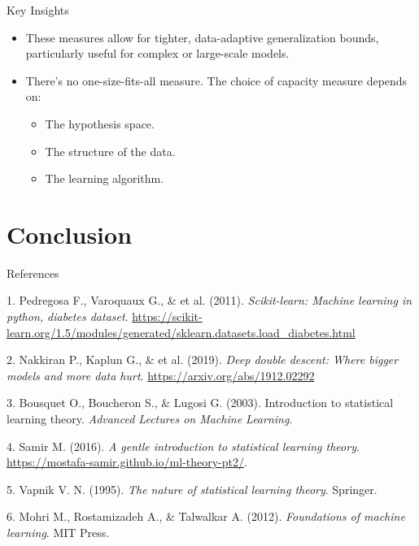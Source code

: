 \documentclass[
  ignorenonframetext,
]{beamer}
\providecommand{\tightlist}{%
  \setlength{\itemsep}{0pt}\setlength{\parskip}{0pt}}\usepackage{longtable,booktabs,array}
\newlength{\cslhangindent}
\newenvironment{CSLReferences}[2] %
 {\begin{list}{}{%
  \setlength{\itemindent}{0pt}
  \setlength{\leftmargin}{0pt}
  \setlength{\parsep}{0pt}
  \ifodd #1
   \setlength{\leftmargin}{\cslhangindent}
   \setlength{\itemindent}{-1\cslhangindent}
  \fi
  \setlength{\itemsep}{#2\baselineskip}}}
 {\end{list}}
\begin{document}
\begin{frame}
\begin{block}{Key Insights}
\label{key-insights-3}
\begin{itemize}
\tightlist
\item
  These measures allow for tighter, data-adaptive generalization bounds,
  particularly useful for complex or large-scale models.
\item
  There's no one-size-fits-all measure. The choice of capacity measure
  depends on:

  \begin{itemize}
  \tightlist
  \item
    The hypothesis space.
  \item
    The structure of the data.
  \item
    The learning algorithm.
  \end{itemize}
\end{itemize}
\end{block}
\end{frame}

\section{Conclusion}\label{conclusion}

\begin{frame}
\begin{block}{References}
\label{references}
\label{refs}
\begin{CSLReferences}{1}{0}
1. Pedregosa F., Varoquaux G., \& et al. (2011). \emph{Scikit-learn:
Machine learning in python, diabetes dataset}.
\url{https://scikit-learn.org/1.5/modules/generated/sklearn.datasets.load_diabetes.html}

2. Nakkiran P., Kaplun G., \& et al. (2019). \emph{Deep double descent:
Where bigger models and more data hurt}.
\url{https://arxiv.org/abs/1912.02292}

3. Bousquet O., Boucheron S., \& Lugosi G. (2003). Introduction to
statistical learning theory. \emph{Advanced Lectures on Machine
Learning}.

4. Samir M. (2016). \emph{A gentle introduction to statistical learning
theory}. \url{https://mostafa-samir.github.io/ml-theory-pt2/}.

5. Vapnik V. N. (1995). \emph{The nature of statistical learning
theory}. Springer.

6. Mohri M., Rostamizadeh A., \& Talwalkar A. (2012). \emph{Foundations
of machine learning}. MIT Press.

\end{CSLReferences}
\end{block}
\end{frame}
\end{document}

